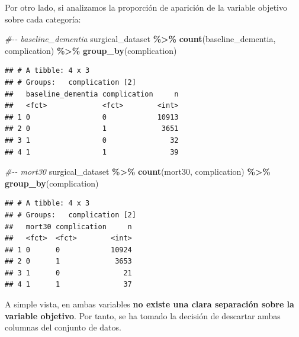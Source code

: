 \documentclass[
]{article}
\newenvironment{Shaded}{\begin{snugshade}}{\end{snugshade}}
\newcommand{\CommentTok}[1]{\textcolor[rgb]{0.56,0.35,0.01}{\textit{#1}}}
\newcommand{\KeywordTok}[1]{\textcolor[rgb]{0.13,0.29,0.53}{\textbf{#1}}}
\newcommand{\NormalTok}[1]{#1}
\newcommand{\OperatorTok}[1]{\textcolor[rgb]{0.81,0.36,0.00}{\textbf{#1}}}
\newcommand{\OtherTok}[1]{\textcolor[rgb]{0.56,0.35,0.01}{#1}}
\newcommand{\StringTok}[1]{\textcolor[rgb]{0.31,0.60,0.02}{#1}}
\begin{document}
Por otro lado, si analizamos la proporción de aparición de la variable
objetivo sobre cada categoría:

\begin{Shaded}
\begin{Highlighting}[]
\CommentTok{\#{-}{-} baseline\_dementia}
\NormalTok{surgical\_dataset }\OperatorTok{\%>\%}
\StringTok{    }\KeywordTok{count}\NormalTok{(baseline\_dementia, complication) }\OperatorTok{\%>\%}
\StringTok{    }\KeywordTok{group\_by}\NormalTok{(complication)}
\end{Highlighting}
\end{Shaded}

\begin{verbatim}
## # A tibble: 4 x 3
## # Groups:   complication [2]
##   baseline_dementia complication     n
##   <fct>             <fct>        <int>
## 1 0                 0            10913
## 2 0                 1             3651
## 3 1                 0               32
## 4 1                 1               39
\end{verbatim}

\begin{Shaded}
\begin{Highlighting}[]
\CommentTok{\#{-}{-} mort30}
\NormalTok{surgical\_dataset }\OperatorTok{\%>\%}
\StringTok{    }\KeywordTok{count}\NormalTok{(mort30, complication) }\OperatorTok{\%>\%}
\StringTok{    }\KeywordTok{group\_by}\NormalTok{(complication)}
\end{Highlighting}
\end{Shaded}

\begin{verbatim}
## # A tibble: 4 x 3
## # Groups:   complication [2]
##   mort30 complication     n
##   <fct>  <fct>        <int>
## 1 0      0            10924
## 2 0      1             3653
## 3 1      0               21
## 4 1      1               37
\end{verbatim}

A simple vista, en ambas variables \textbf{no existe una clara
separación sobre la variable objetivo}. Por tanto, se ha tomado la
decisión de descartar ambas columnas del conjunto de datos.

\begin{Shaded}
\end{Shaded}
\end{document}
